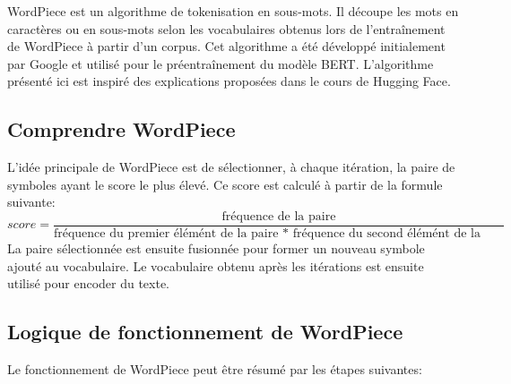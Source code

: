 \documentclass[12pt,a4paper]{report}
\begin{document}
	WordPiece est un algorithme de tokenisation en sous-mots. Il découpe les mots en caractères ou en sous-mots selon les vocabulaires obtenus lors de l'entraînement de WordPiece à partir d'un corpus. Cet algorithme a été développé initialement par Google et utilisé pour le préentraînement du modèle BERT. 
	L'algorithme présenté ici est inspiré des explications proposées dans le cours de Hugging Face.
	
	\subsection{Comprendre WordPiece}
	
	L'idée principale de WordPiece est de sélectionner, à chaque itération, la paire de symboles ayant le score le plus élevé. Ce score est calculé à partir de la formule suivante:
	\[
	score = \frac{\text{fréquence de la paire}}{\text{fréquence du premier élémént de la paire * fréquence du second élémént de la paire}}
	\]
	La paire sélectionnée est ensuite fusionnée pour former un nouveau symbole ajouté au vocabulaire. Le vocabulaire obtenu après les itérations est ensuite utilisé pour encoder du texte.
	
	\subsection{Logique de fonctionnement de WordPiece}
	
	Le fonctionnement de WordPiece peut être résumé par les étapes suivantes:
	
\end{document}
